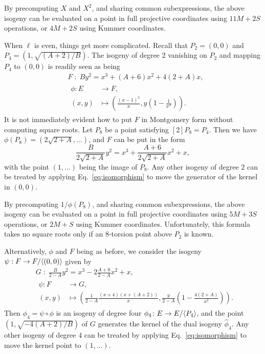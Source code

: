By precomputing $X$ and $X^2$, and sharing common subexpressions, the
above isogeny can be evaluated on a point in full projective
coordinates using $11M+2S$ operations, or $4M + 2S$ using Kummer
coordinates.

When $\ell$ is even, things get more complicated. Recall that
$P_2=(0,0)$ and $P_4=(1,\sqrt{(A+2)/B})$. The isogeny of degree $2$
vanishing on $P_2$ and mapping $P_4$ to $(0,0)$ is readily seen as
being
\begin{align}
  \label{eq:isogeny-2}
  &F \;:\;  By^2 = x^3 + (A+6)x^2 + 4(2+A)x,\\
  &\begin{aligned}
    \phi : E &\to F,\\
    (x,y) &\mapsto \left(\frac{(x-1)^2}{x}, y\left(1 - \frac{1}{x^2}\right)\right).
  \end{aligned}
\end{align}
It is not immediately evident how to put $F$ in Montgomery form
without computing square roots. Let $P_8$ be a point satisfying
$[2]P_8=P_4$. Then we have $\phi(P_8)=(2\sqrt{2+A},\ldots)$, and $F$ can be
put in the form
\[\frac{B}{2\sqrt{2+A}}y^2 = x^3 + \frac{A+6}{2\sqrt{2+A}}x^2 + x,\]
with the point $(1,\ldots)$ being the image of $P_8$.  Any other
isogeny of degree $2$ can be treated by applying
Eq.~\eqref{eq:isomorphism} to move the generator of the kernel in
$(0,0)$.

By precomputing $1/\phi(P_8)$, and sharing common subexpressions, the
above isogeny can be evaluated on a point in full projective
coordinates using $5M+3S$ operations, or $2M+S$ using Kummer
coordinates. Unfortunately, this formula takes no square roots only if
an $8$-torsion point above $P_2$ is known.


Alternatively, $\phi$ and $F$ being as before, we consider the isogeny
$\psi:F\to F/{\langle (0,0) \rangle}$ given by
\begin{align}
  \label{eq:isogeny-4}
  &G \;:\;  \frac{B}{2-A}y^2 = x^3 - 2\frac{A+6}{2-A}x^2 + x,\\
  &\begin{aligned}
    \psi : F &\to G,\\
    (x,y) &\mapsto \left(\frac{1}{2-A}\frac{(x+4)(x+(A+2))}{x}, \frac{y}{2-A}\left(1 - \frac{4(2+A)}{x^2}\right)\right).
  \end{aligned}
\end{align}
Then $\phi_4 = \psi\circ\phi$ is an isogeny of degree four
$\phi_4\colon E\to
E/{\langle P_4 \rangle}$, and the point $\left(1,\sqrt{-4(A+2)/B}\right)$ of $G$
generates the kernel of the dual isogeny $\hat{\phi}_4$. Any other
isogeny of degree $4$ can be treated by applying
Eq.~\eqref{eq:isomorphism} to move the kernel point to $(1,\ldots)$.

